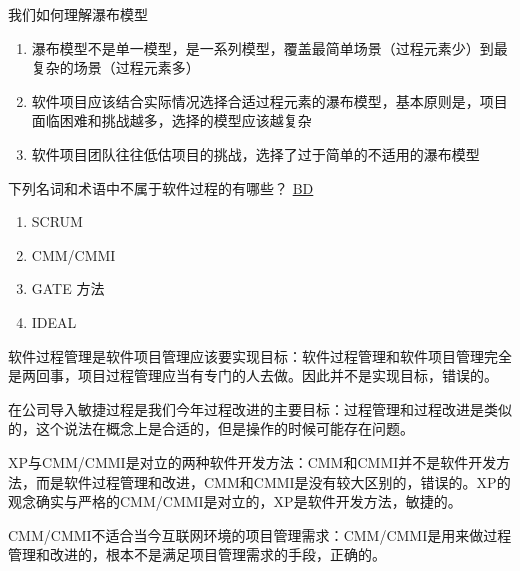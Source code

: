 \begin{problem}
我们如何理解瀑布模型
\begin{enumerate}[label=\arabic*.]
    \item 瀑布模型不是单一模型，是一系列模型，覆盖最简单场景（过程元素少）到最复杂的场景（过程元素多）
    \item 软件项目应该结合实际情况选择合适过程元素的瀑布模型，基本原则是，项目面临困难和挑战越多，选择的模型应该越复杂
    \item 软件项目团队往往低估项目的挑战，选择了过于简单的不适用的瀑布模型
\end{enumerate} 
\end{problem}

\begin{problem}
	下列名词和术语中不属于软件过程的有哪些？
	\uline{BD}    
    \vspace{-0.8em}
    \begin{multicols}{4}
        \begin{enumerate}[label=\Alph*.]
            \item SCRUM
            \item CMM/CMMI
            \item GATE 方法
            \item IDEAL
        \end{enumerate}
    \end{multicols}
    \vspace{-1em}
\end{problem}

\begin{problem}
{\kaishu 软件过程管理是软件项目管理应该要实现目标：}软件过程管理和软件项目管理完全是两回事，项目过程管理应当有专门的人去做。因此并不是实现目标，错误的。
\end{problem}

\begin{problem}
{\kaishu 在公司导入敏捷过程是我们今年过程改进的主要目标：}过程管理和过程改进是类似的，这个说法在概念上是合适的，但是操作的时候可能存在问题。
\end{problem}

\begin{problem}
{\kaishu XP与CMM/CMMI是对立的两种软件开发方法：}CMM和CMMI并不是软件开发方法，而是软件过程管理和改进，CMM和CMMI是没有较大区别的，错误的。XP的观念确实与严格的CMM/CMMI是对立的，XP是软件开发方法，敏捷的。
\end{problem}

\begin{problem}
{\kaishu CMM/CMMI不适合当今互联网环境的项目管理需求：}CMM/CMMI是用来做过程管理和改进的，根本不是满足项目管理需求的手段，正确的。
\end{problem}


